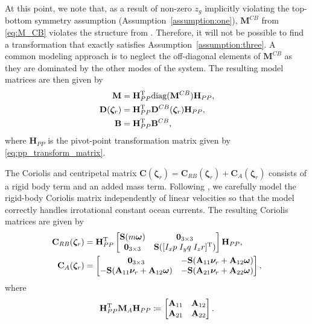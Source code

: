 At this point, we note that, as a result of non-zero $z_g$ implicitly violating the top-bottom symmetry assumption (Assumption~\ref{assumption:one}), $\mathbf{M}^{CB}$ from \eqref{eq:M_CB} violates the structure from \cite[Equation 4]{borhaug_straight_2007}. Therefore, it will not be possible to find a transformation that exactly satisfies Assumption~\ref{assumption:three}. A common modeling approach is to neglect the off-diagonal elements of $\mathbf{M}^{CB}$ as they are dominated by the other modes of the system. The resulting model matrices are then given by
\begin{subequations}
\begin{align}
    \mathbf{M} &= \mathbf{H}_{PP}^{\rm T} \mathrm{diag}(\mathbf{M}^{CB}) \mathbf{H}_{PP},\\
    \mathbf{D}(\bm{\zeta}_r) &= \mathbf{H}_{PP}^{\rm T} \mathbf{D}^{CB}(\bm{\zeta}_r)  \mathbf{H}_{PP},\\
    \mathbf{B} &= \mathbf{H}_{PP}^{\rm T} \mathbf{B}^{CB},
\end{align}
\end{subequations}
where $\mathbf{H}_{PP}$ is the pivot-point transformation matrix given by \eqref{eq:pp_transform_matrix}.

The Coriolis and centripetal matrix $\mathbf{C}(\bm{\zeta}_r) = \mathbf{C}_{RB}(\bm{\zeta}_r) + \mathbf{C}_A(\bm{\zeta}_r)$ consists of a rigid body term and an added mass term. Following \cite[Section~10.3]{fossen_handbook_2021}, we carefully model the rigid-body Coriolis matrix independently of linear velocities so that the model correctly handles irrotational constant ocean currents. The resulting Coriolis matrices are given by
\begin{align}
    \mathbf{C}_{RB}(\bm{\zeta}_r) &= \mathbf{H}_{PP}^{\rm T} \begin{bmatrix}
        \mathbf{S}(m\bm{\omega}) & \mathbf{0}_{3\times 3}\\
        \mathbf{0}_{3\times 3} & \mathbf{S}([I_x p\; I_y q\; I_z r]^{\rm T})
    \end{bmatrix}\mathbf{H}_{PP},\\
    \mathbf{C}_A(\bm{\zeta}_r) &= \begin{bmatrix}
        \mathbf{0}_{3\times 3} & - \mathbf{S}(\mathbf{A}_{11} \bm{\nu}_r + \mathbf{A}_{12}\bm{\omega})\\
        - \mathbf{S}(\mathbf{A}_{11} \bm{\nu}_r + \mathbf{A}_{12}\bm{\omega}) & - \mathbf{S}(\mathbf{A}_{21} \bm{\nu}_r + \mathbf{A}_{22}\bm{\omega})
    \end{bmatrix},
\end{align}
where 
\begin{equation}
    \mathbf{H}_{PP}^{\rm T}\mathbf{M}_A\mathbf{H}_{PP} \coloneqq \begin{bmatrix}
        \mathbf{A}_{11} & \mathbf{A}_{12}\\\mathbf{A}_{21} & \mathbf{A}_{22}
    \end{bmatrix}.
\end{equation}

